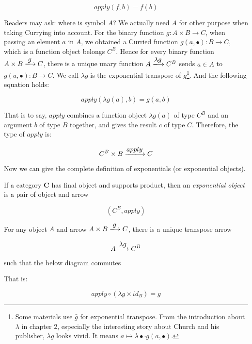 \documentclass{article}
\begin{document}
\[
apply(f, b) = f(b)
\]

Readers may ask: where is symbol $A$? We actually need $A$ for other purpose when taking Currying into account. For the binary function $g: A \times B \to C$, when passing an element $a$ in $A$, we obtained a Curried function $g(a, \bullet) : B \to C$, which is a function object belongs $C^B$. Hence for every binary function $A \times B \arrowto{g} C$, there is a unique unary function $A \arrowto{\lambda g} C^B$ sends $a \in A$ to $g(a, \bullet) : B \to C$. We call $\lambda g$ is the exponential transpose of $g$\footnote{Some materials use $\bar{g}$ for exponential transpose. From the introduction about $\lambda$ in chapter 2, especially the interesting story about Church and his publisher, $\lambda g$ looks vivid. It means $a \mapsto \lambda \bullet \cdot g(a, \bullet)$.}. And the following equation holds:

\[
apply(\lambda g(a), b) = g(a, b)
\]

That is to say, $apply$ combines a function object $\lambda g(a)$ of type $C^B$ and an argument $b$ of type $B$ together, and gives the result $c$ of type $C$. Therefore, the type of $apply$ is:

\[
C^B \times B \arrowto{apply} C
\]

 
Now we can give the complete definition of exponentials (or exponential objects).

\begin{definition}
\normalfont
If a category $\pmb{C}$ has final object and supports product, then an {\em exponential object} is a pair of object and arrow

\[
(C^B, apply)
\]

For any object $A$ and arrow $A \times B \arrowto{g} C$, there is a unique transpose arrow

\[
 A \arrowto{\lambda g} C^B
\]

such that the below diagram commutes

\begin{center}
\end{center}

That is:

\[
  apply \circ (\lambda g \times id_B) = g
\]

\end{definition}
\end{document}
